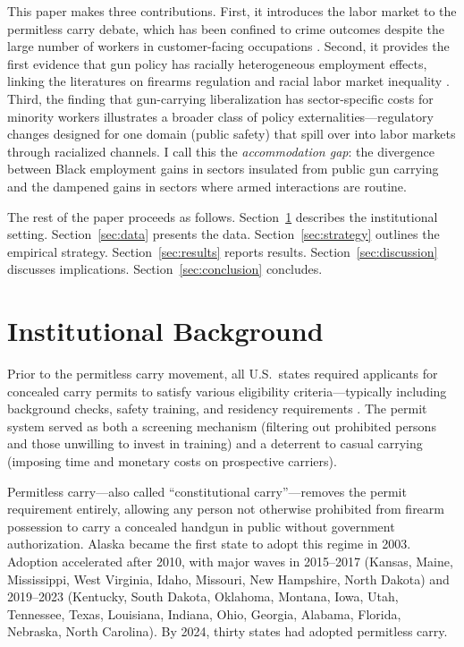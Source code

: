 \documentclass[12pt]{article}
\begin{document}
This paper makes three contributions. First, it introduces the labor market to the permitless carry debate, which has been confined to crime outcomes despite the large number of workers in customer-facing occupations \citep{rand2020effects}. Second, it provides the first evidence that gun policy has racially heterogeneous employment effects, linking the literatures on firearms regulation \citep{webster2020reducing} and racial labor market inequality \citep{lang2020race}. Third, the finding that gun-carrying liberalization has sector-specific costs for minority workers illustrates a broader class of policy externalities---regulatory changes designed for one domain (public safety) that spill over into labor markets through racialized channels. I call this the \emph{accommodation gap}: the divergence between Black employment gains in sectors insulated from public gun carrying and the dampened gains in sectors where armed interactions are routine.

The rest of the paper proceeds as follows. Section~\ref{sec:background} describes the institutional setting. Section~\ref{sec:data} presents the data. Section~\ref{sec:strategy} outlines the empirical strategy. Section~\ref{sec:results} reports results. Section~\ref{sec:discussion} discusses implications. Section~\ref{sec:conclusion} concludes.

\section{Institutional Background}
\label{sec:background}

Prior to the permitless carry movement, all U.S.\ states required applicants for concealed carry permits to satisfy various eligibility criteria---typically including background checks, safety training, and residency requirements \citep{siegel2017easiness}. The permit system served as both a screening mechanism (filtering out prohibited persons and those unwilling to invest in training) and a deterrent to casual carrying (imposing time and monetary costs on prospective carriers).

Permitless carry---also called ``constitutional carry''---removes the permit requirement entirely, allowing any person not otherwise prohibited from firearm possession to carry a concealed handgun in public without government authorization. Alaska became the first state to adopt this regime in 2003. Adoption accelerated after 2010, with major waves in 2015--2017 (Kansas, Maine, Mississippi, West Virginia, Idaho, Missouri, New Hampshire, North Dakota) and 2019--2023 (Kentucky, South Dakota, Oklahoma, Montana, Iowa, Utah, Tennessee, Texas, Louisiana, Indiana, Ohio, Georgia, Alabama, Florida, Nebraska, North Carolina). By 2024, thirty states had adopted permitless carry.
\end{document}
